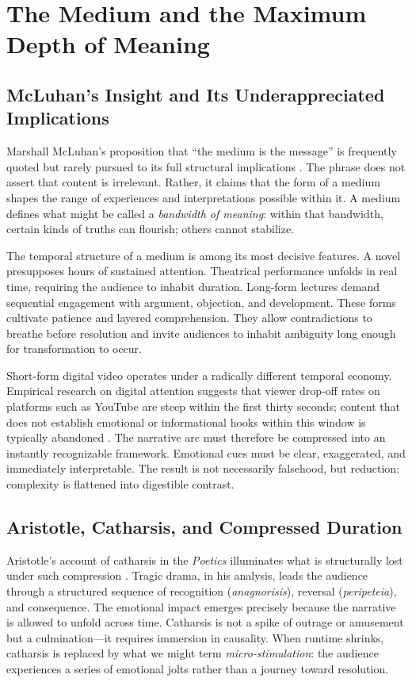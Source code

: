 \documentclass[12pt]{article}
\begin{document}
\section{The Medium and the Maximum Depth of Meaning}
\label{sec:medium}

\subsection{McLuhan's Insight and Its Underappreciated Implications}

Marshall McLuhan's proposition that ``the medium is the message'' is frequently quoted but rarely pursued to its full structural implications \citep{McLuhan1994}. The phrase does not assert that content is irrelevant. Rather, it claims that the form of a medium shapes the range of experiences and interpretations possible within it. A medium defines what might be called a \emph{bandwidth of meaning}: within that bandwidth, certain kinds of truths can flourish; others cannot stabilize.

The temporal structure of a medium is among its most decisive features. A novel presupposes hours of sustained attention. Theatrical performance unfolds in real time, requiring the audience to inhabit duration. Long-form lectures demand sequential engagement with argument, objection, and development. These forms cultivate patience and layered comprehension. They allow contradictions to breathe before resolution and invite audiences to inhabit ambiguity long enough for transformation to occur.

Short-form digital video operates under a radically different temporal economy. Empirical research on digital attention suggests that viewer drop-off rates on platforms such as YouTube are steep within the first thirty seconds; content that does not establish emotional or informational hooks within this window is typically abandoned \citep{Dobrowolski2019}. The narrative arc must therefore be compressed into an instantly recognizable framework. Emotional cues must be clear, exaggerated, and immediately interpretable. The result is not necessarily falsehood, but reduction: complexity is flattened into digestible contrast.

\subsection{Aristotle, Catharsis, and Compressed Duration}

Aristotle's account of catharsis in the \emph{Poetics} illuminates what is structurally lost under such compression \citep{Aristotle1996}. Tragic drama, in his analysis, leads the audience through a structured sequence of recognition (\emph{anagnorisis}), reversal (\emph{peripeteia}), and consequence. The emotional impact emerges precisely because the narrative is allowed to unfold across time. Catharsis is not a spike of outrage or amusement but a culmination---it requires immersion in causality. When runtime shrinks, catharsis is replaced by what we might term \emph{micro-stimulation}: the audience experiences a series of emotional jolts rather than a journey toward resolution.
\end{document}
